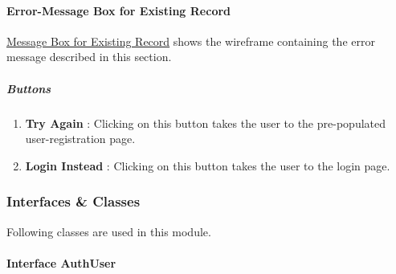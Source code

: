 \documentclass{article}%
\begin{document}
\paragraph{Error{-}Message Box for Existing Record}%

%
%
\hyperlink{ID:1641632316}{Message Box for Existing Record}%
\xspace%
 shows the wireframe containing the error message described in this section.%
\hypertarget{ID:1767876160}{}%
\subparagraph{Buttons}%

%
\par%
\begin{enumerate}%
\item%
\hypertarget{ID:1751968326}{}%
\textbf{Try Again}%
: %
Clicking on this button takes the user to the pre{-}populated user{-}registration page.%
\par%
\item%
\hypertarget{ID:179044637}{}%
\textbf{Login Instead}%
: %
Clicking on this button takes the user to the login page.%
\par%
\end{enumerate}%
\hypertarget{ID:1181162309}{}%
\subsubsection{Interfaces \& Classes}%

%
Following classes are used in this module.%
\hypertarget{ID:358586165}{}%
\paragraph{Interface AuthUser}%
\end{document}
